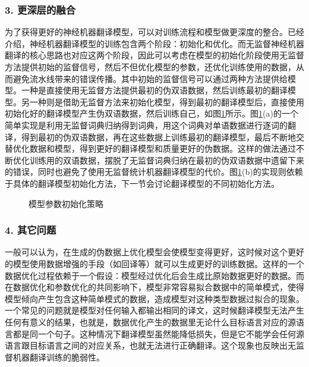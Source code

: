\subsubsection{3. 更深层的融合}

\parinterval 为了获得更好的神经机器翻译模型，可以对训练流程和模型做更深度的整合。{\chapterten}已经介绍，神经机器翻译模型的训练包含两个阶段：初始化和优化。而无监督神经机器翻译的核心思路也对应这两个阶段，因此可以考虑在模型的初始化阶段使用无监督方法提供初始的监督信号，然后不但优化模型的参数，还优化训练使用的数据，从而避免流水线带来的错误传播。其中初始的监督信号可以通过两种方法提供给模型。一种是直接使用无监督方法提供最初的伪双语数据，然后训练最初的翻译模型。另一种则是借助无监督方法来初始化模型，得到最初的翻译模型后，直接使用初始化好的翻译模型产生伪双语数据，然后训练自己，如图\ref{fig:16-18}所示。图\ref{fig:16-18}(a)的一个简单实现是利用无监督词典归纳得到词典，用这个词典对单语数据进行逐词的翻译，得到最初的伪双语数据，再在这些数据上训练最初的翻译模型，最后不断地交替优化数据和模型，得到更好的翻译模型和质量更好的伪数据。这样的做法通过不断优化训练用的双语数据，摆脱了无监督词典归纳在最初的伪双语数据中遗留下来的错误，同时也避免了使用无监督统计机器翻译模型的代价。图\ref{fig:16-18}(b)的实现则依赖于具体的翻译模型初始化方法，下一节会讨论翻译模型的不同初始化方法。
\begin{figure}[h]
\centering

\caption{模型参数初始化策略}
\label{fig:16-18}
\end{figure}

\subsubsection{4. 其它问题}

\parinterval 一般可以认为，在生成的伪数据上优化模型会使模型变得更好，这时候对这个更好的模型使用数据增强的手段（如回译等）就可以生成更好的训练数据。这样的一个数据优化过程依赖于一个假设：模型经过优化后会生成比原始数据更好的数据。而在数据优化和参数优化的共同影响下，模型非常容易拟合数据中的简单模式，使得模型倾向产生包含这种简单模式的数据，造成模型对这种类型数据过拟合的现象。一个常见的问题就是模型对任何输入都输出相同的译文，这时候翻译模型无法产生任何有意义的结果，也就是，数据优化产生的数据里无论什么目标语言对应的源语言都是同一个句子。这种情况下翻译模型虽然能降低损失，但是它不能学会任何源语言跟目标语言之间的对应关系，也就无法进行正确翻译。这个现象也反映出无监督机器翻译训练的脆弱性。

